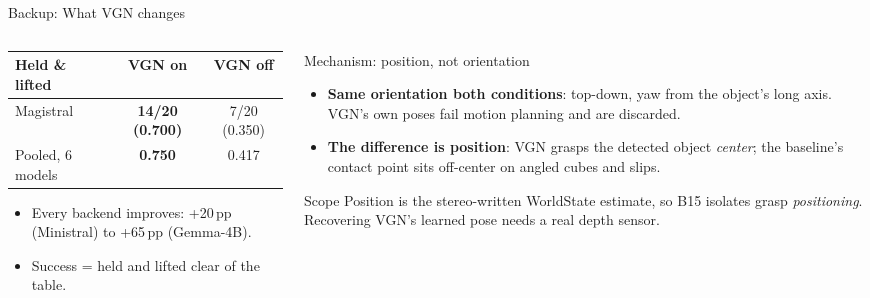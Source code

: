 \documentclass[aspectratio=169,11pt]{beamer}
\begin{document}
\begin{frame}[noframenumbering]{Backup: What VGN changes}
	\begin{columns}[T]
		\begin{column}{0.5\textwidth}
			\begin{table}\scriptsize
				\begin{tabular}{lcc}
					\toprule
					\textbf{Held \& lifted} & \textbf{VGN on}        & \textbf{VGN off} \\
					\midrule
					Magistral               & \textbf{14/20 (0.700)} & 7/20 (0.350)     \\
					Pooled, 6 models        & \textbf{0.750}         & 0.417            \\
					\bottomrule
				\end{tabular}
			\end{table}
			\footnotesize
			\begin{itemize}\footnotesize
				\item Every backend improves: +20\,pp (Ministral) to +65\,pp (Gemma-4B).
				\item Success = held and lifted clear of the table.
			\end{itemize}
		\end{column}
		\begin{column}{0.5\textwidth}
			\begin{block}{Mechanism: position, not orientation}
				\footnotesize
				\begin{itemize}\footnotesize
					\item \textbf{Same orientation both conditions}: top-down, yaw from the object's long axis. VGN's own poses fail motion planning and are discarded.
					\item \textbf{The difference is position}: VGN grasps the detected object \textit{center}; the baseline's contact point sits off-center on angled cubes and slips.
				\end{itemize}
			\end{block}
			\begin{block}{Scope}
				\footnotesize Position is the stereo-written WorldState estimate, so B15 isolates grasp \textit{positioning}. Recovering VGN's learned pose needs a real depth sensor.
			\end{block}
		\end{column}
	\end{columns}
\end{frame}
\end{document}
